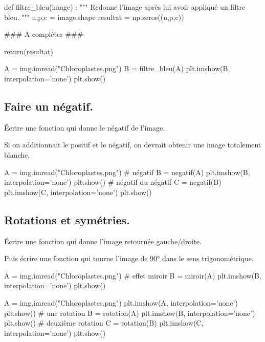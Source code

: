 \documentclass[french,11pt,twoside]{VcCours}
\begin{document}
\begin{PY}
def filtre_bleu(image) :
    """ Redonne l'image après lui avoir appliqué un filtre bleu.
    """
    n,p,c = image.shape
    resultat = np.zeros((n,p,c))

    ### A compléter ###
        
    return(resultat)
\end{PY}
\begin{PY}
A = img.imread("Chloroplastes.png")
B = filtre_bleu(A)
plt.imshow(B, interpolation='none')
plt.show()
\end{PY}

\subsection{Faire un négatif.}
\begin{Exercice}
	Écrire une fonction  qui donne le négatif de l'image.
	
	Si on additionnait le positif et le négatif, on devrait obtenir une image totalement blanche.
\end{Exercice}

\begin{PY}
A = img.imread("Chloroplastes.png")
# négatif
B = negatif(A)
plt.imshow(B, interpolation='none')
plt.show()
# négatif du négatif
C = negatif(B)
plt.imshow(C, interpolation='none')
plt.show()
\end{PY}

\subsection{Rotations et symétries.}
\begin{Exercice}
	Écrire une fonction  qui donne l'image retournée gauche/droite.
	
	Puis écrire une fonction  qui tourne l'image de 90° dans le sens trigonométrique.
\end{Exercice}

\begin{PY}
A = img.imread("Chloroplastes.png")
# effet miroir
B = miroir(A)
plt.imshow(B, interpolation='none')
plt.show()
\end{PY}

\begin{PY}
       A = img.imread("Chloroplastes.png")
       plt.imshow(A, interpolation='none')
       plt.show()
       # une rotation
       B = rotation(A)
       plt.imshow(B, interpolation='none')
       plt.show()
       # deuxième rotation
       C = rotation(B)
       plt.imshow(C, interpolation='none')
       plt.show()
       ​\end{PY}
\end{document}
